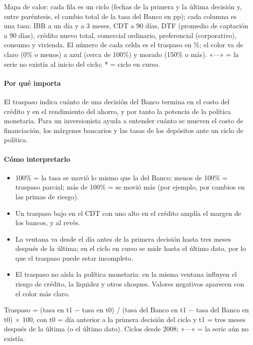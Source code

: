 \begin{leer}
Mapa de calor: cada fila es un ciclo (fechas de la primera y la última decisión y, entre paréntesis, el cambio total de la tasa del Banco en pp); cada columna es una tasa: IBR a un día y a 3 meses, CDT a 90 días, DTF (promedio de captación a 90 días), crédito nuevo total, comercial ordinario, preferencial (corporativo), consumo y vivienda. El número de cada celda es el traspaso en \%; el color va de claro (0\% o menos) a azul (cerca de 100\%) y morado (150\% o más). «—» = la serie no existía al inicio del ciclo; * = ciclo en curso.
\end{leer}

\paragraph{Por qué importa}
El traspaso indica cuánto de una decisión del Banco termina en el costo del crédito y en el rendimiento del ahorro, y por tanto la potencia de la política monetaria. Para un inversionista ayuda a entender cuánto se mueven el costo de financiación, los márgenes bancarios y las tasas de los depósitos ante un ciclo de política.

\paragraph{Cómo interpretarlo}
\begin{itemize}
\item 100\% = la tasa se movió lo mismo que la del Banco; menos de 100\% = traspaso parcial; más de 100\% = se movió más (por ejemplo, por cambios en las primas de riesgo).
\item Un traspaso bajo en el CDT con uno alto en el crédito amplía el margen de los bancos, y al revés.
\item La ventana va desde el día antes de la primera decisión hasta tres meses después de la última; en el ciclo en curso se mide hasta el último dato, por lo que el traspaso puede estar incompleto.
\item El traspaso no aísla la política monetaria: en la misma ventana influyen el riesgo de crédito, la liquidez y otros choques. Valores negativos aparecen con el color más claro.
\end{itemize}
\begin{formulas}[Fórmulas]
\end{formulas}
\begin{metodo}[Metodología]
Traspaso = (tasa en t1 − tasa en t0) / (tasa del Banco en t1 − tasa del Banco en t0) $\times$ 100, con t0 = día anterior a la primera decisión del ciclo y t1 = tres meses después de la última (o el último dato). Ciclos desde 2008; «—» = la serie aún no existía.
\par{}
\end{metodo}

